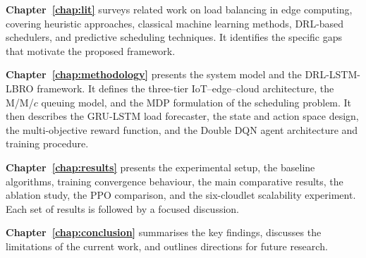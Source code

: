 \textbf{Chapter~\ref{chap:lit}} surveys related work on load balancing
in edge computing, covering heuristic approaches, classical machine
learning methods, DRL-based schedulers, and predictive scheduling
techniques. It identifies the specific gaps that motivate the proposed
framework.

\textbf{Chapter~\ref{chap:methodology}} presents the system model
and the DRL-LSTM-LBRO framework. It defines the three-tier
IoT--edge--cloud architecture, the M/M/$c$ queuing model, and the
MDP formulation of the scheduling problem. It then describes the
GRU-LSTM load forecaster, the state and action space design, the
multi-objective reward function, and the Double DQN agent architecture
and training procedure.

\textbf{Chapter~\ref{chap:results}} presents the experimental setup,
the baseline algorithms, training convergence behaviour, the main
comparative results, the ablation study, the PPO comparison, and the
six-cloudlet scalability experiment. Each set of results is followed
by a focused discussion.

\textbf{Chapter~\ref{chap:conclusion}} summarises the key findings,
discusses the limitations of the current work, and outlines directions
for future research.
